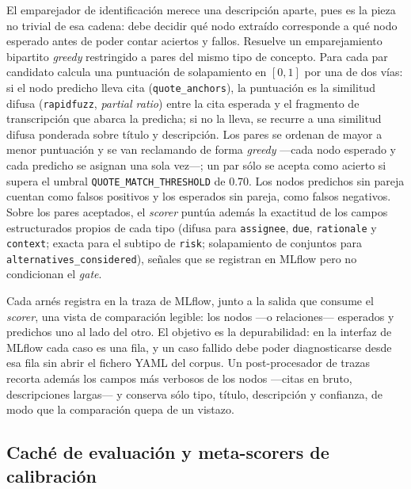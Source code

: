 El emparejador de identificación merece una descripción aparte, pues es la pieza no trivial de esa
cadena: debe decidir qué nodo extraído corresponde a qué nodo esperado antes de poder contar
aciertos y fallos. Resuelve un emparejamiento bipartito \textit{greedy} restringido a pares del
mismo tipo de concepto. Para cada par candidato calcula una puntuación de solapamiento en $[0,1]$
por una de dos vías: si el nodo predicho lleva cita (\texttt{quote\_anchors}), la puntuación es la
similitud difusa (\texttt{rapidfuzz}, \textit{partial ratio}) entre la cita esperada y el fragmento
de transcripción que abarca la predicha; si no la lleva, se recurre a una similitud difusa
ponderada sobre título y descripción. Los pares se ordenan de mayor a menor puntuación y se van
reclamando de forma \textit{greedy} —cada nodo esperado y cada predicho se asignan una sola vez—;
un par sólo se acepta como acierto si supera el umbral \texttt{QUOTE\_MATCH\_THRESHOLD} de 0.70. Los
nodos predichos sin pareja cuentan como falsos positivos y los esperados sin pareja, como falsos
negativos. Sobre los pares aceptados, el \textit{scorer} puntúa además la exactitud de los campos
estructurados propios de cada tipo (difusa para \texttt{assignee}, \texttt{due}, \texttt{rationale}
y \texttt{context}; exacta para el subtipo de \texttt{risk}; solapamiento de conjuntos para
\texttt{alternatives\_considered}), señales que se registran en MLflow pero no condicionan el
\textit{gate}.

Cada arnés registra en la traza de MLflow, junto a la salida que consume el \textit{scorer}, una
vista de comparación legible: los nodos —o relaciones— esperados y predichos uno al lado del otro.
El objetivo es la depurabilidad: en la interfaz de MLflow cada caso es una fila, y un caso fallido
debe poder diagnosticarse desde esa fila sin abrir el fichero YAML del corpus. Un
post-procesador de trazas recorta además los campos más verbosos de los nodos —citas en bruto,
descripciones largas— y conserva sólo tipo, título, descripción y confianza, de modo que la
comparación quepa de un vistazo.

\subsection{Caché de evaluación y meta-scorers de calibración}
\label{anx:cache-eval}


